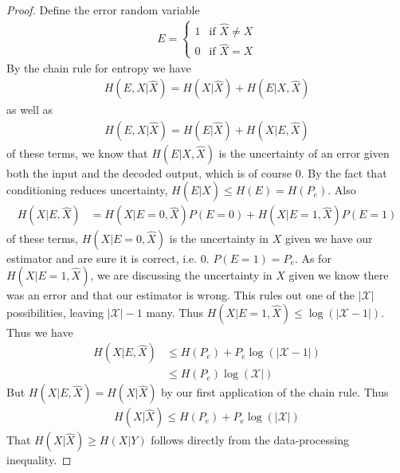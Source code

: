 \documentclass{article}
\theoremstyle{definition}
\theoremstyle{plain}
\begin{document}
\begin{proof}
	Define the error random variable
	\begin{align}
		E = \begin{cases} 1 & \textrm{if }\hat{X} \neq X \\ 0 & \textrm{if }\hat{X}=X \end{cases}
	\end{align}
	By the chain rule for entropy we have
	\begin{align}
		H(E,X|\hat{X}) = H(X|\hat{X}) + H(E|X,\hat{X})
	\end{align}
	as well as 
	\begin{align}
		H(E,X|\hat{X}) = H(E|\hat{X}) + H(X|E,\hat{X})
	\end{align}
	of these terms, we know that $H(E|X,\hat{X})$ is the uncertainty of an error given both the input and the decoded output, which is of course $0$. By the fact that conditioning reduces uncertainty, $H(E|\hat{X}) \leq H(E) = H(P_e)$. Also 
	\begin{align}
		H(X|E,\hat{X}) &= H(X|E=0,\hat{X})P(E=0) + H(X|E=1,\hat{X})P(E=1) 
	\end{align}
	of these terms, $H(X|E=0,\hat{X})$ is the uncertainty in $X$ given we have our estimator and are sure it is correct, i.e. $0$. $P(E=1) = P_e$. As for $H(X|E=1,\hat{X})$, we are discussing the uncertainty in $X$ given we know there was an error and that our estimator is wrong. This rules out one of the $|\mathcal{X}|$ possibilities, leaving $|\mathcal{X}|-1$ many. Thus $H(X|E=1,\hat{X}) \leq \log(|\mathcal{X}-1|)$. Thus we have
	\begin{align}
		H(X|E,\hat{X}) &\leq H(P_e) + P_e\log(|\mathcal{X}-1|) \\ &\leq H(P_e)\log(\mathcal{X}|) 
	\end{align} 
	But $H(X|E,\hat{X}) = H(X|\hat{X})$ by our first application of the chain rule. Thus
	\begin{align}
		H(X|\hat{X}) \leq H(P_e) + P_e\log(|\mathcal{X}|)
	\end{align}
	That $H(X|\hat{X}) \geq H(X|Y)$ follows directly from the data-processing inequality. 
\end{proof}
\end{document}
